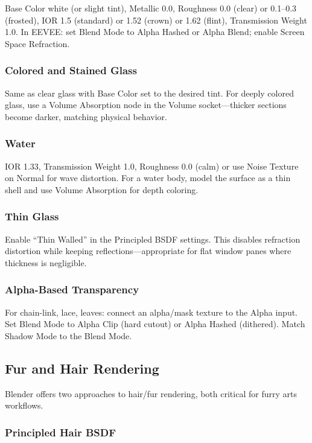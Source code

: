 Base Color white (or slight tint), Metallic 0.0, Roughness 0.0
(clear) or 0.1--0.3 (frosted), IOR 1.5 (standard) or 1.52 (crown)
or 1.62 (flint), Transmission Weight 1.0. In EEVEE: set Blend Mode
to Alpha Hashed or Alpha Blend; enable Screen Space Refraction.

\subsubsection{Colored and Stained Glass}

Same as clear glass with Base Color set to the desired tint. For
deeply colored glass, use a Volume Absorption node in the Volume
socket---thicker sections become darker, matching physical behavior.

\subsubsection{Water}

IOR 1.33, Transmission Weight 1.0, Roughness 0.0 (calm) or use
Noise Texture on Normal for wave distortion. For a water body,
model the surface as a thin shell and use Volume Absorption for
depth coloring.

\subsubsection{Thin Glass}

Enable ``Thin Walled'' in the Principled BSDF settings. This
disables refraction distortion while keeping reflections---appropriate
for flat window panes where thickness is negligible.

\subsubsection{Alpha-Based Transparency}

For chain-link, lace, leaves: connect an alpha/mask texture to the
Alpha input. Set Blend Mode to Alpha Clip (hard cutout) or Alpha
Hashed (dithered). Match Shadow Mode to the Blend Mode.

\subsection{Fur and Hair Rendering}
\label{sec:shading:hair}

Blender offers two approaches to hair/fur rendering, both critical
for furry arts workflows.

\subsubsection{Principled Hair BSDF}

